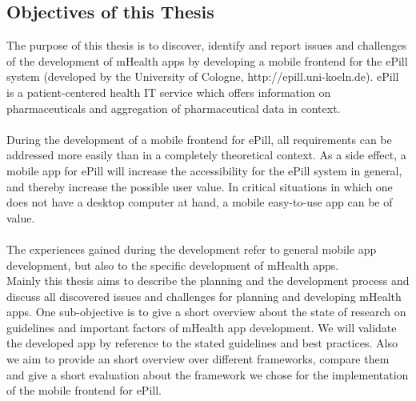 \subsection{Objectives of this Thesis}
The purpose of this thesis is to discover, identify and report issues and challenges of the development of mHealth apps by developing a mobile frontend for the ePill system (developed by the University of Cologne, http://epill.uni-koeln.de). ePill is a patient-centered health IT service which offers information on pharmaceuticals and aggregation of pharmaceutical data in context.
\\
\\
During the development of a mobile frontend for ePill, all requirements can be addressed more easily than in a completely theoretical context. As a side effect, a mobile app for ePill will increase the accessibility for the ePill system in general, and thereby increase the possible user value. In critical situations in which one does not have a desktop computer at hand, a mobile easy-to-use app can be of value.
\\
\\
The experiences gained during the development refer to general mobile app development, but also to the specific development of mHealth apps.
\\
Mainly this thesis aims to describe the planning and the development process and discuss all discovered issues and challenges for planning and developing mHealth apps. One sub-objective is to give a short overview about the state of research on guidelines and important factors of mHealth app development. We will validate the developed app by reference to the stated guidelines and best practices. Also we aim to provide an short overview over different frameworks, compare them and give a short evaluation about the framework we chose for the implementation of the mobile frontend for ePill.